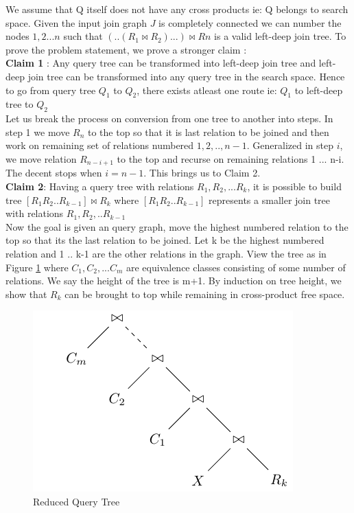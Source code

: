 We assume that Q itself does not have any cross products ie: Q belongs to search space. Given the input join graph $J$ is completely connected we can number the nodes $1,2...n$ such that $(..(R_{1}\bowtie R_{2})...)\bowtie R{n}$ is a valid left-deep join tree. To prove the problem statement, we prove a stronger claim : \\

\textbf{Claim 1} : Any query tree can be transformed into left-deep join tree and left-deep join tree can be transformed into any query tree in the search space. Hence to go from query tree $Q_{1}$ to $Q_{2}$, there exists atleast one route ie: $Q_{1}$ to left-deep tree to $Q_{2}$\\

Let us break the process on conversion from one tree to another into steps. In step 1 we move $R_{n}$ to the top so that it is last relation to be joined and then work on remaining set of relations numbered $1,2,..,n-1$. Generalized in step $i$, we move relation $R_{n-i+1}$ to the top and recurse on remaining relations 1 ... n-i. The decent stops when $i=n-1$. This brings us to Claim 2. \\

\textbf{Claim 2}: Having a query tree with relations $R_{1},R_{2},...R_{k}$, it is possible to build tree $[R_{1}R_{2}..R_{k-1}] \bowtie R_{k}$ where $[R_{1}R_{2}..R_{k-1}]$ represents a smaller join tree with relations $R_{1},R_{2},..R_{k-1}$ \\

Now the goal is given an query graph, move the highest numbered relation to the top so that its the last relation to be joined. Let k be the highest numbered relation and 1 .. k-1 are the other relations in the graph. View the tree as in Figure \ref{fig:rsb1-proof} where $C_{1}, C_{2}, ... C_{m}$ are equivalence classes consisting of some number of relations. We say the height of the tree is m+1. By induction on tree height, we show that $R_{k}$ can be brought to top while remaining in cross-product free space. \\

\begin{figure}[here]
\begin{center}
\includegraphics{Figures/rsb1-proof.pdf}
\end{center}
\caption{Reduced Query Tree}
\label{fig:rsb1-proof}
\end{figure}

